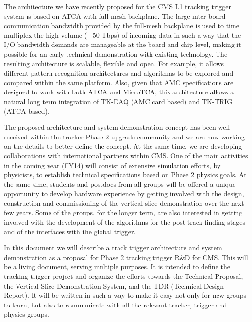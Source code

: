 The architecture we have recently proposed for the CMS L1 tracking trigger system is based on ATCA with full-mesh backplane. The large inter-board communication bandwidth provided by the full-mesh backplane is used to time multiplex the high volume (~ 50 Tbps) of incoming data in such a way that the I/O bandwidth demands are manageable at the board and chip level, making it possible for an early technical demonstration with existing technology. The resulting architecture is scalable, flexible and open. For example, it allows different pattern recognition architectures and algorithms to be explored and compared within the same platform. Also, given that AMC specifications are designed to work with both ATCA and MicroTCA, this architecture allows a natural long term integration of TK-DAQ (AMC card based) and TK-TRIG (ATCA based).

The proposed architecture and system demonstration concept has been well received within the tracker Phase 2 upgrade community and we are now working on the details to better define the concept.  At the same time, we are developing collaborations with international partners within CMS. One of the main activities in the coming year (FY14) will consist of extensive simulation efforts, by physicists, to establish technical specifications based on Phase 2 physics goals. At the same time, students and postdocs from all groups will be offered a unique opportunity to develop hardware experience by getting involved with the design, construction and commissioning of the vertical slice demonstration over the next few years. Some of the groups, for the longer term, are also interested in getting involved with the development of the algorithms for the post-track-finding stages and of the interfaces with the global trigger. 

In this document we will describe a track trigger architecture and system demonstration as a proposal for Phase 2 tracking trigger R\&D for CMS. This will be a living document, serving multiple purposes. It is intended to define the tracking trigger project and organize the efforts towards the Technical Proposal, the Vertical Slice Demonstration System, and the TDR (Technical Design Report). It will be written in such a way to make it easy not only for new groups to learn, but also to communicate with all the relevant tracker, trigger and physics groups.

\clearpage
